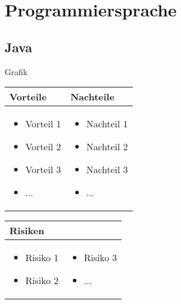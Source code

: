 
\section{Programmiersprache}


\subsection{Java}

Grafik

\begin{table}[h]
\begin{tabular}{p{} | p{}}


 \textbf{Vorteile} & \textbf{Nachteile} \\ \hline
	 
\begin{itemize}
\item Vorteil 1
\item Vorteil 2
\item Vorteil 3
\item ...
\end{itemize}

 
 &
 
\begin{itemize}
\item Nachteil 1
\item Nachteil 2
\item Nachteil 3
\item ...
\end{itemize}

\end{tabular}
\end{table}

\begin{table}[h]
\begin{tabular}{p{}p{}}


 \textbf{Risiken} & \\ \hline
	 
\begin{itemize}
\item Risiko 1
\item Risiko 2
\end{itemize}
&
\begin{itemize}
\item Risiko 3
\item ...
\end{itemize}

 
\end{tabular}
\end{table}

